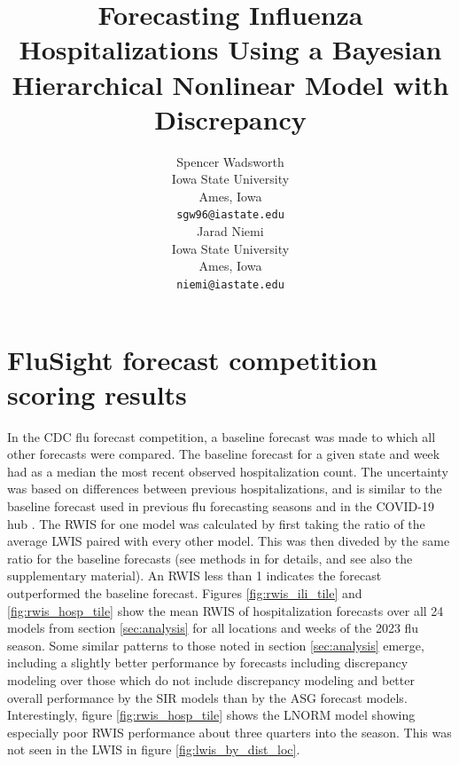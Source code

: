 \documentclass{article}
\title{Forecasting Influenza Hospitalizations Using a Bayesian Hierarchical Nonlinear Model with Discrepancy
}
\author{
  Spencer Wadsworth \\
  Iowa State University \\
  Ames, Iowa\\
  \texttt{sgw96@iastate.edu} \\
   \And
  Jarad Niemi \\
  Iowa State University \\
  Ames, Iowa\\
  \texttt{niemi@iastate.edu} \\
}
\begin{document}
 

\section{FluSight forecast competition scoring results} \label{app:A_rwis}

In the CDC flu forecast competition, a baseline forecast was made to which all other forecasts were compared. The baseline forecast for a given state and week had as a median the most recent observed hospitalization count. The uncertainty was based on differences between previous hospitalizations, and is similar to the baseline forecast used in previous flu forecasting seasons and in the COVID-19 hub \cite[]{mathis2024evaluation, cramer2022evaluation}. 
The RWIS for one model was calculated by first taking the ratio of the average LWIS paired with every other model. This was then diveded by the same ratio for the baseline forecasts (see methods in \cite{mathis2024evaluation} for details, and see also the supplementary material).
 An RWIS less than 1 indicates the forecast outperformed the baseline forecast.
 Figures \ref{fig:rwis_ili_tile} and \ref{fig:rwis_hosp_tile} show the mean RWIS of hospitalization forecasts over all 24 models from section \ref{sec:analysis} for all locations and weeks of the 2023 flu season. Some similar patterns to those noted in section \ref{sec:analysis} emerge, including a slightly better performance by forecasts including discrepancy modeling over those which do not include discrepancy modeling and better overall performance by the SIR models than by the ASG forecast models. Interestingly, figure \ref{fig:rwis_hosp_tile} shows the LNORM model showing especially poor RWIS performance about three quarters into the season. This was not seen in the LWIS in figure \ref{fig:lwis_by_dist_loc}. 
\end{document}
